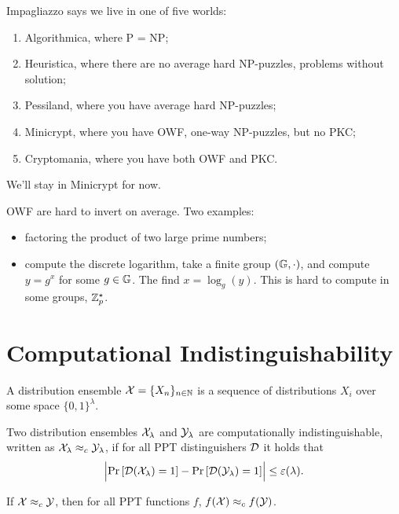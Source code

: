 Impagliazzo says we live in one of five worlds:
\begin{enumerate}
	\item Algorithmica, where P = NP;
	\item Heuristica, where there are no average hard NP-puzzles, \ie problems without solution;
	\item Pessiland, where you have average hard NP-puzzles;
	\item Minicrypt, where you have \ac{OWF}, one-way NP-puzzles, but no \ac{PKC};
	\item Cryptomania, where you have both \ac{OWF} and \ac{PKC}.
\end{enumerate}
We'll stay in Minicrypt for now.

\ac{OWF} are hard to invert on average.
Two examples:
\begin{itemize}
	\item factoring the product of two large prime numbers;
	\item compute the discrete logarithm, \ie take a finite group $(\mathbb{G}, \cdot)$, and compute $y = g^x$ for some $g \in \mathbb{G}$.
	The find $x = \log_{g}(y)$.
	This is hard to compute in some groups, \eg $\mathbb{Z}^{\star}_{p}$.
\end{itemize}

\section{Computational Indistinguishability}

\begin{definition}
	A distribution ensemble $\mathcal{X} = \{ X_n \}_{n \in \mathbb{N}}$ is a sequence of distributions $X_i$ over some space $\{0,1\}^{\lambda}$.
\end{definition}

\begin{definition}
	Two distribution ensembles $\mathcal{X}_{\lambda}$ and $\mathcal{Y}_{\lambda}$ are computationally indistinguishable, written as $\mathcal{X}_{\lambda} \approx_c \mathcal{Y}_{\lambda}$, if for all \ac{PPT} distinguishers $\mathcal{D}$ it holds that
	\begin{equation*}
		\left|{\mathop{\mathrm{Pr}}\limits_{} \left[ {\mathcal{D}(\mathcal{X}_{\lambda}) = 1} \right] - \mathop{\mathrm{Pr}}\limits_{} \left[ {\mathcal{D}(\mathcal{Y}_{\lambda}) = 1} \right]}\right| \le \varepsilon(\lambda).
	\end{equation*}
\end{definition}

\begin{lemma}[Reduction] \label{lem:reduction}
	If $\mathcal{X} \approx_c \mathcal{Y}$, then for all \ac{PPT} functions $f$, $f(\mathcal{X}) \approx_c f(\mathcal{Y})$.
\end{lemma}

